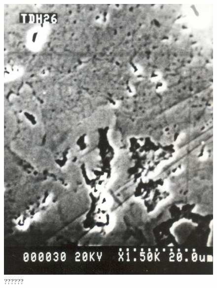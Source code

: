 \begin{figure}[H]
\renewcommand{\thefigure}{26B}
\includegraphics[scale=0.65]{images/chapter-4/fig026B.jpg}
\caption{??????}\label{chapter-4-fig26B}
\end{figure}


